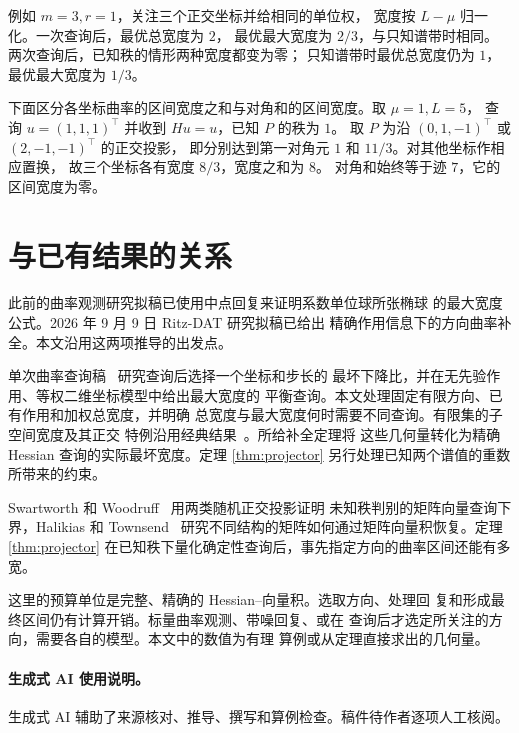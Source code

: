 \documentclass[UTF8,11pt,fontset=windows]{ctexart}
\begin{document}
例如 \(m=3,r=1\)，关注三个正交坐标并给相同的单位权，
宽度按 \(L-\mu\) 归一化。一次查询后，最优总宽度为 \(2\)，
最优最大宽度为 \(2/3\)，与只知谱带时相同。
两次查询后，已知秩的情形两种宽度都变为零；
只知谱带时最优总宽度仍为 \(1\)，最优最大宽度为 \(1/3\)。

下面区分各坐标曲率的区间宽度之和与对角和的区间宽度。取 \(\mu=1,L=5\)，
查询 \(u=(1,1,1)^\top\) 并收到 \(Hu=u\)，已知 \(P\) 的秩为 \(1\)。
取 \(P\) 为沿 \((0,1,-1)^\top\) 或 \((2,-1,-1)^\top\) 的正交投影，
即分别达到第一对角元 \(1\) 和 \(11/3\)。对其他坐标作相应置换，
故三个坐标各有宽度 \(8/3\)，宽度之和为 \(8\)。
对角和始终等于迹 \(7\)，它的区间宽度为零。

\section{与已有结果的关系}

此前的曲率观测研究拟稿已使用中点回复来证明系数单位球所张椭球
的最大宽度公式。2026 年 9 月 9 日 Ritz-DAT 研究拟稿已给出
精确作用信息下的方向曲率补全。本文沿用这两项推导的出发点。

单次曲率查询稿~\cite{coordinate} 研究查询后选择一个坐标和步长的
最坏下降比，并在无先验作用、等权二维坐标模型中给出最大宽度的
平衡查询。本文处理固定有限方向、已有作用和加权总宽度，并明确
总宽度与最大宽度何时需要不同查询。有限集的子空间宽度及其正交
特例沿用经典结果~\cite{DTV,HouleToussaint,Sofman}。所给补全定理将
这些几何量转化为精确 Hessian 查询的实际最坏宽度。定理
\ref{thm:projector} 另行处理已知两个谱值的重数所带来的约束。

Swartworth 和 Woodruff~\cite{SwartworthWoodruff} 用两类随机正交投影证明
未知秩判别的矩阵向量查询下界，Halikias 和 Townsend~\cite{HalikiasTownsend}
研究不同结构的矩阵如何通过矩阵向量积恢复。定理 \ref{thm:projector}
在已知秩下量化确定性查询后，事先指定方向的曲率区间还能有多宽。

这里的预算单位是完整、精确的 Hessian--向量积。选取方向、处理回
复和形成最终区间仍有计算开销。标量曲率观测、带噪回复、或在
查询后才选定所关注的方向，需要各自的模型。本文中的数值为有理
算例或从定理直接求出的几何量。


\paragraph{生成式 AI 使用说明。}
生成式 AI 辅助了来源核对、推导、撰写和算例检查。稿件待作者逐项人工核阅。
\end{document}
